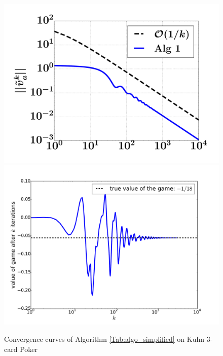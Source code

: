 \documentclass{article} %
\begin{document}
\begin{figure}
  \includegraphics[width=1\linewidth]{Kuhn3112_dgap.pdf}
  \includegraphics[width=1\linewidth]{Kuhn3112_NE.pdf}
  \caption{Convergence curves of Algorithm \ref{Tab:algo_simplified} on Kuhn 3-card Poker}
  \label{Tab:dgap_curve}
\end{figure}

\end{document}
